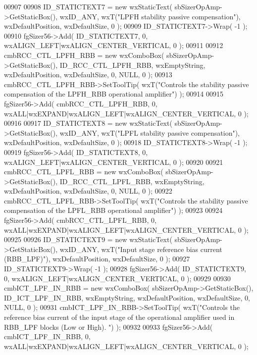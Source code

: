 \begin{DoxyCode}
00907     
00908     ID_STATICTEXT7 = \textcolor{keyword}{new} wxStaticText( sbSizerOpAmp->GetStaticBox(), wxID\_ANY, wxT(\textcolor{stringliteral}{"LPFH stability passive
       compensation"}), wxDefaultPosition, wxDefaultSize, 0 );
00909     ID_STATICTEXT7->Wrap( -1 );
00910     fgSizer56->Add( ID_STATICTEXT7, 0, wxALIGN\_LEFT|wxALIGN\_CENTER\_VERTICAL, 0 );
00911     
00912     cmbRCC_CTL_LPFH_RBB = \textcolor{keyword}{new} wxComboBox( sbSizerOpAmp->GetStaticBox(), 
      ID_RCC_CTL_LPFH_RBB, wxEmptyString, wxDefaultPosition, wxDefaultSize, 0, NULL, 0 ); 
00913     cmbRCC_CTL_LPFH_RBB->SetToolTip( wxT(\textcolor{stringliteral}{"Controls the stability passive compensation of the LPFH\_RBB
       operational amplifier"}) );
00914     
00915     fgSizer56->Add( cmbRCC_CTL_LPFH_RBB, 0, wxALL|wxEXPAND|wxALIGN\_LEFT|wxALIGN\_CENTER\_VERTICAL, 0 );
00916     
00917     ID_STATICTEXT8 = \textcolor{keyword}{new} wxStaticText( sbSizerOpAmp->GetStaticBox(), wxID\_ANY, wxT(\textcolor{stringliteral}{"LPFL stability passive
       compensation"}), wxDefaultPosition, wxDefaultSize, 0 );
00918     ID_STATICTEXT8->Wrap( -1 );
00919     fgSizer56->Add( ID_STATICTEXT8, 0, wxALIGN\_LEFT|wxALIGN\_CENTER\_VERTICAL, 0 );
00920     
00921     cmbRCC_CTL_LPFL_RBB = \textcolor{keyword}{new} wxComboBox( sbSizerOpAmp->GetStaticBox(), 
      ID_RCC_CTL_LPFL_RBB, wxEmptyString, wxDefaultPosition, wxDefaultSize, 0, NULL, 0 ); 
00922     cmbRCC_CTL_LPFL_RBB->SetToolTip( wxT(\textcolor{stringliteral}{"Controls the stability passive compensation of the LPFL\_RBB
       operational amplifier"}) );
00923     
00924     fgSizer56->Add( cmbRCC_CTL_LPFL_RBB, 0, wxALL|wxEXPAND|wxALIGN\_LEFT|wxALIGN\_CENTER\_VERTICAL, 0 );
00925     
00926     ID_STATICTEXT9 = \textcolor{keyword}{new} wxStaticText( sbSizerOpAmp->GetStaticBox(), wxID\_ANY, wxT(\textcolor{stringliteral}{"Input stage reference
       bias current (RBB\_LPF)"}), wxDefaultPosition, wxDefaultSize, 0 );
00927     ID_STATICTEXT9->Wrap( -1 );
00928     fgSizer56->Add( ID_STATICTEXT9, 0, wxALIGN\_LEFT|wxALIGN\_CENTER\_VERTICAL, 0 );
00929     
00930     cmbICT_LPF_IN_RBB = \textcolor{keyword}{new} wxComboBox( sbSizerOpAmp->GetStaticBox(), 
      ID_ICT_LPF_IN_RBB, wxEmptyString, wxDefaultPosition, wxDefaultSize, 0, NULL, 0 ); 
00931     cmbICT_LPF_IN_RBB->SetToolTip( wxT(\textcolor{stringliteral}{"Controls the reference bias current of the input stage of the
       operational amplifier used in RBB\_LPF blocks (Low or High). "}) );
00932     
00933     fgSizer56->Add( cmbICT_LPF_IN_RBB, 0, wxALL|wxEXPAND|wxALIGN\_LEFT|wxALIGN\_CENTER\_VERTICAL, 0 );

\end{DoxyCode}
